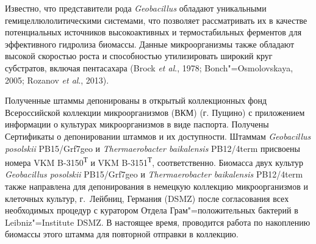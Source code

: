 \documentclass[a4paper,12pt,openany,final]{extreport}
\begin{document}
Известно, что представители рода \emph{Geobacillus} обладают уникальными гемицеллюлолитическими системами, что позволяет рассматривать их в качестве потенциальных источников высокоактивных и термостабильных ферментов для эффективного гидролиза биомассы. Данные микроорганизмы также обладают высокой скоростью роста и способностью утилизировать широкий круг субстратов, включая пентасахара (Brock \textit{et al}., 1978; Bonch"=Osmolovskaya, 2005; Rozanov \textit{et al}., 2013).

Полученные штаммы депонированы в открытый коллекционных фонд Всероссийской коллекции микроорганизмов (ВКМ) (г. Пущино) с приложением информации о культурах микроорганизмов в виде паспорта. Получены Сертификаты о депонировании штаммов и их доступности. Штаммам \emph{Geobacillus posolskii} PB15/Grf7geo и \emph{Thermaerobacter baikalensis} PB12/4term присвоены номера VKM B-3150\textsuperscript{Т} и VKM B-3151\textsuperscript{Т}, соответственно. Биомасса двух культур \emph{Geobacillus posolskii} PB15/Grf7geo и \emph{Thermaerobacter baikalensis} PB12/4term также направлена для депонирования в немецкую коллекцию микроорганизмов и клеточных культур, г.~Лейбниц, Германия (DSMZ) после согласования всех необходимых процедур с куратором Отдела Грам"=положительных бактерий в Leibniz"=Institute DSMZ. В настоящее время, проводится работа по накоплению биомассы этого штамма для повторной отправки в коллекцию.
\vspace{2em}
\end{document}
